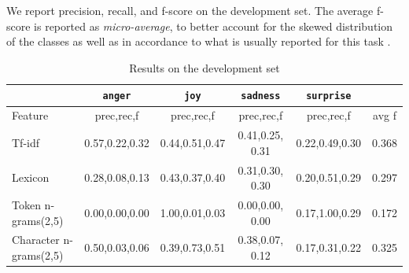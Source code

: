 \documentclass[11pt]{article}
\begin{document}
We report precision, recall, and f-score on the development set. The average f-score is reported as \textit{micro-average}, to better account for the skewed distribution of the classes as well as in accordance to what is usually reported for this task \cite{mohammad2015using}.

\begin{table}[!htbp]
\caption{Results on the development set\label{test_results_svm}}
\centering
\begin{tabular}{|l|c|c|c|c|c|}
\hline
    & \texttt{anger} & \texttt{joy} & \texttt{sadness} & \texttt{surprise} &  \\ 
    \hline
          Feature         & prec,rec,f & prec,rec,f & prec,rec,f & prec,rec,f & avg f \\

\hline
  \footnotesize{Tf-idf} &
  \footnotesize{0.57,0.22,0.32}  & 
  \footnotesize{0.44,0.51,0.47} & 
  \footnotesize{0.41,0.25, 0.31} & 
  \footnotesize{0.22,0.49,0.30} & 
  \footnotesize{{0.368}}  \\ 


\hline
  \footnotesize{Lexicon} &
  \footnotesize{0.28,0.08,0.13}  & 
  \footnotesize{0.43,0.37,0.40} & 
  \footnotesize{0.31,0.30, 0.30} & 
  \footnotesize{0.20,0.51,0.29} & 
   \footnotesize{{0.297}}  \\ 


\hline
  \footnotesize{Token n-grams(2,5)} &
  \footnotesize{0.00,0.00,0.00}  & 
  \footnotesize{1.00,0.01,0.03} & 
  \footnotesize{0.00,0.00, 0.00} & 
  \footnotesize{0.17,1.00,0.29} & 
  \footnotesize{{0.172}}  \\ 


\hline
  \footnotesize{Character n-grams(2,5)} &
  \footnotesize{0.50,0.03,0.06}  & 
  \footnotesize{0.39,0.73,0.51} & 
  \footnotesize{0.38,0.07, 0.12} & 
  \footnotesize{0.17,0.31,0.22} & 
  \footnotesize{{0.325}}  \\ 



\end{tabular}
\end{table}
\end{document}
